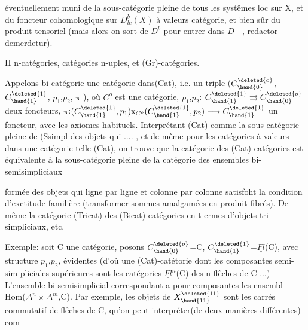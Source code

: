 
éventuellement muni de la sous-catégorie pleine de tous les systêmes loc
sur X, et du foncteur cohomologique sur $D^{b}_{lc}(X)$ à valeurs  
catégorie, et bien sûr du produit tensoriel (mais alors on sort de $D^{b}$
pour entrer dans $D^{-}$ , redactor demerdetur).

II \quad n-catégories, catégories n-uples, et (Gr)-catégories.

Appelons bi-catégorie une catégorie dans(Cat), i.e. un triple
($C^{\deleted{o}}_{\hand{0}}$,$C^{\deleted{1}}_{\hand{1}}$, $p_{1}$,$p_{2}$, $\pi$ ), où $C^{o}$ est une catégorie, $p_{1}$,$p_{2}$: $C^{\deleted{1}}_{\hand{1}} \rightrightarrows C^{\deleted{o}}_{\hand{0}}$ deux
foncteurs, $\pi$:$(C^{\deleted{1}}_{\hand{1}},p_{1})\mathrm{x}_{C^{o}}(C^{\deleted{1}}_{\hand{1}},p_{2}) \longrightarrow C^{\deleted{1}}_{\hand{1}}$ un foncteur, avec les axiomes
habituels. Interprétant (Cat) comme la sous-catégorie pleine de (Ssimpl
des objets qui .... , et de même pour les catégories à valeurs dans une
catégorie telle (Cat), on trouve que la catégorie  des (Cat)-catégories
est équivalente à la sous-catégorie pleine de la catégorie des ensembles
bi-semisimpliciaux


formée des objets qui ligne par ligne et colonne par colonne satisfoht la
condition d'exctitude familière (transformer sommes amalgamées en produit
fibrés). De même la catégorie  (Tricat) des (Bicat)-catégories
 en t ermes d'objets tri-simpliciaux, etc.

Exemple: soit C une catégorie, posons $C^{\deleted{o}}_{\hand{0}}$=C, $C^{\deleted{1}}_{\hand{1}}$=$\underline{Fl}$(C), avec structure
$p_{1}$,$p_{2}$, évidentes (d'où une (Cat)-catétorie dont les composantes semi-sim
pliciales supérieures sont les catégories $\underline{Fl}^{n}$(C) des n-flêches de C ...)
L'ensemble bi-semisimplicial correspondant a pour composantes les ensembl
Hom($\Delta^{n}\times\Delta^{m}$,C). Par exemple, les objets de $X^{\deleted{11}}_{\hand{11}}$ sont les carrés commutatif
de flêches de C, qu'on peut interpréter(de deux manières différentes) com

